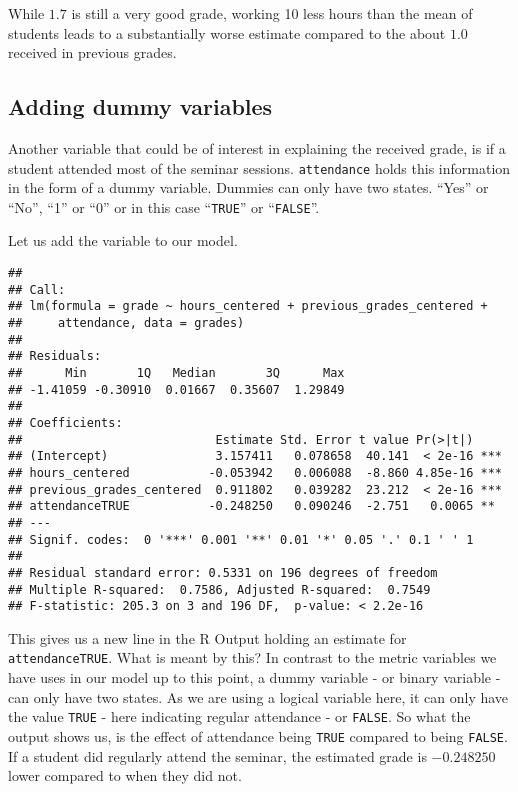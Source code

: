 \documentclass[
]{book}
\begin{document}
While \(1.7\) is still a very good grade, working 10 less hours than the mean of
students leads to a substantially worse estimate compared to the about \(1.0\)
received in previous grades.

\hypertarget{adding-dummy-variables}{%
\subsection{Adding dummy variables}\label{adding-dummy-variables}}

Another variable that could be of interest in explaining the received grade,
is if a student attended most of the seminar sessions.
\texttt{attendance} holds this information in the form of a dummy variable. Dummies can
only have two states. ``Yes'' or ``No'', ``1'' or ``0'' or in this case ``\texttt{TRUE}'' or
``\texttt{FALSE}''.

Let us add the variable to our model.

\begin{verbatim}
## 
## Call:
## lm(formula = grade ~ hours_centered + previous_grades_centered + 
##     attendance, data = grades)
## 
## Residuals:
##      Min       1Q   Median       3Q      Max 
## -1.41059 -0.30910  0.01667  0.35607  1.29849 
## 
## Coefficients:
##                           Estimate Std. Error t value Pr(>|t|)    
## (Intercept)               3.157411   0.078658  40.141  < 2e-16 ***
## hours_centered           -0.053942   0.006088  -8.860 4.85e-16 ***
## previous_grades_centered  0.911802   0.039282  23.212  < 2e-16 ***
## attendanceTRUE           -0.248250   0.090246  -2.751   0.0065 ** 
## ---
## Signif. codes:  0 '***' 0.001 '**' 0.01 '*' 0.05 '.' 0.1 ' ' 1
## 
## Residual standard error: 0.5331 on 196 degrees of freedom
## Multiple R-squared:  0.7586, Adjusted R-squared:  0.7549 
## F-statistic: 205.3 on 3 and 196 DF,  p-value: < 2.2e-16
\end{verbatim}

This gives us a new line in the R Output holding an estimate for
\texttt{attendanceTRUE}. What is meant by this? In contrast to the metric variables we
have uses in our model up to this point, a dummy variable - or binary variable -
can only have two states. As we are using a logical variable here, it can only
have the value \texttt{TRUE} - here indicating regular attendance - or \texttt{FALSE}. So what
the output shows us, is the effect of attendance being \texttt{TRUE} compared to being
\texttt{FALSE}. If a student did regularly attend the seminar, the estimated grade is
\(-0.248250\) lower compared to when they did not.
\end{document}
